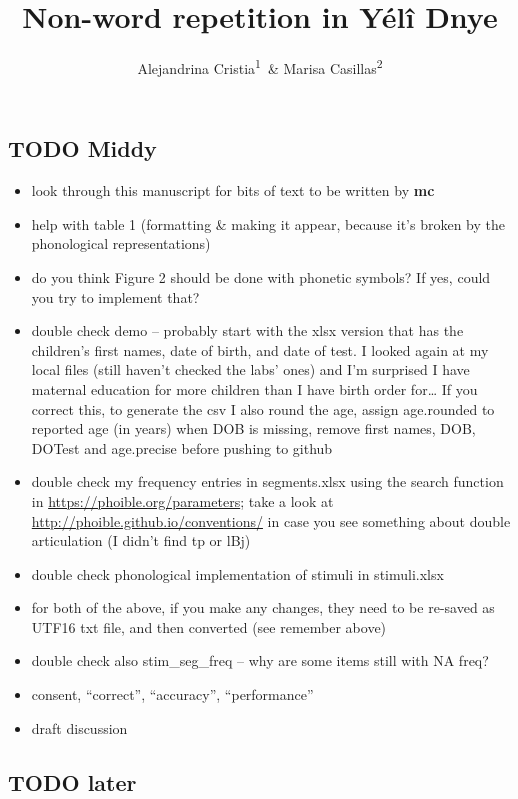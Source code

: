 \documentclass[english,,man,floatsintext]{apa6}
\title{Non-word repetition in Yélî Dnye}
\author{Alejandrina Cristia\textsuperscript{1}~\& Marisa
Casillas\textsuperscript{2}}
\date{}
\providecommand{\tightlist}{%
  \setlength{\itemsep}{0pt}\setlength{\parskip}{0pt}}
\begin{document}
\maketitle

\subsection{TODO Middy}\label{todo-middy}

\begin{itemize}
\tightlist
\item
  look through this manuscript for bits of text to be written by
  \textbf{mc}
\item
  help with table 1 (formatting \& making it appear, because it's broken
  by the phonological representations)
\item
  do you think Figure 2 should be done with phonetic symbols? If yes,
  could you try to implement that?
\item
  double check demo -- probably start with the xlsx version that has the
  children's first names, date of birth, and date of test. I looked
  again at my local files (still haven't checked the labs' ones) and I'm
  surprised I have maternal education for more children than I have
  birth order for\ldots{} If you correct this, to generate the csv I
  also round the age, assign age.rounded to reported age (in years) when
  DOB is missing, remove first names, DOB, DOTest and age.precise before
  pushing to github
\item
  double check my frequency entries in segments.xlsx using the search
  function in \url{https://phoible.org/parameters}; take a look at
  \url{http://phoible.github.io/conventions/} in case you see something
  about double articulation (I didn't find tp or lBj)
\item
  double check phonological implementation of stimuli in stimuli.xlsx
\item
  for both of the above, if you make any changes, they need to be
  re-saved as UTF16 txt file, and then converted (see remember above)
\item
  double check also stim\_seg\_freq -- why are some items still with NA
  freq?
\item
  consent, ``correct'', ``accuracy'', ``performance''
\item
  draft discussion
\end{itemize}

\subsection{TODO later}\label{todo-later}
\end{document}
